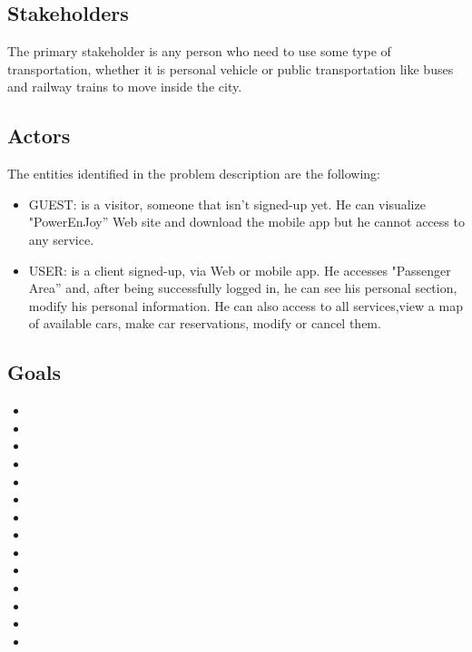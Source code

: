 \subsection{Stakeholders}
	The primary stakeholder is any person who need to use some type of transportation, whether it is personal vehicle or public transportation like buses and railway trains to move inside the city.


\subsection{Actors}
The entities identified in the problem description are the following: 
\begin{itemize}
	\item GUEST: is a visitor, someone that isn't signed-up yet. He can visualize
	"PowerEnJoy'' Web site and download the mobile app but he cannot
	access to any service.
	\item USER: is a client signed-up, via Web or mobile app. He accesses
	"Passenger Area'' and, after being successfully logged in, he can see
	his personal section, modify his personal information. He can also
	access to all services,view a map of available cars, make car reservations, modify or
	cancel them.
\end{itemize}

\subsection{Goals}
\begin{itemize}
	\item {}
	\item {}
	\item {}
	\item {}
	\item {}
	\item {}
	\item {}
	\item {}
	\item {}
	\item {}
	\item {}
	\item {}
	\item {}
	\item {}

\end{itemize}



\pagebreak{}


